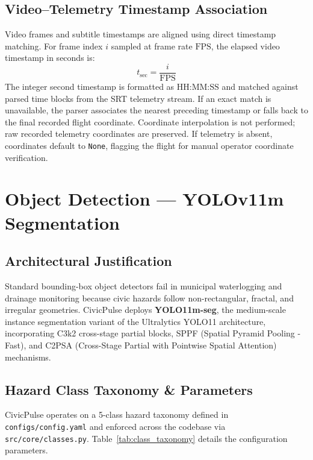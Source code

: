 \documentclass[11pt,a4paper]{article}
\begin{document}
\subsection{Video--Telemetry Timestamp Association}
Video frames and subtitle timestamps are aligned using direct timestamp matching. For frame index $i$ sampled at frame rate $\text{FPS}$, the elapsed video timestamp in seconds is:
\begin{equation}
t_{\text{sec}} = \frac{i}{\text{FPS}}
\end{equation}
The integer second timestamp is formatted as $\text{HH:MM:SS}$ and matched against parsed time blocks from the SRT telemetry stream. If an exact match is unavailable, the parser associates the nearest preceding timestamp or falls back to the final recorded flight coordinate. Coordinate interpolation is not performed; raw recorded telemetry coordinates are preserved. If telemetry is absent, coordinates default to \texttt{None}, flagging the flight for manual operator coordinate verification.

\section{Object Detection --- YOLOv11m Segmentation}

\subsection{Architectural Justification}
Standard bounding-box object detectors fail in municipal waterlogging and drainage monitoring because civic hazards follow non-rectangular, fractal, and irregular geometries. CivicPulse deploys \textbf{YOLO11m-seg}, the medium-scale instance segmentation variant of the Ultralytics YOLO11 architecture, incorporating C3k2 cross-stage partial blocks, SPPF (Spatial Pyramid Pooling - Fast), and C2PSA (Cross-Stage Partial with Pointwise Spatial Attention) mechanisms.

\subsection{Hazard Class Taxonomy \& Parameters}
CivicPulse operates on a 5-class hazard taxonomy defined in \texttt{configs/config.yaml} and enforced across the codebase via \texttt{src/core/classes.py}. Table~\ref{tab:class_taxonomy} details the configuration parameters.
\end{document}
